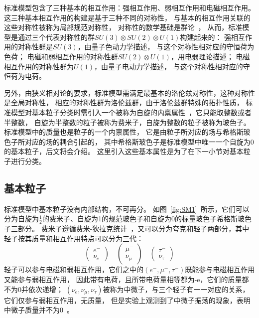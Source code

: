 标准模型包含了三种基本的相互作用：强相互作用、弱相互作用和电磁相互作用。
这三种基本相互作用的构建是基于三种不同的对称性，
与基本的相互作用关联的这些对称性被称为局部规范对称性，
对称性的数学基础是群论~\cite{GROUP}，
从而，标准模型是通过三个代表对称性的群$SU(3)	\otimes SU(2)	\otimes U(1)$构建起来的：
强相互作用的对称性群是$SU(3)$，由量子色动力学描述，
与这个对称性相对应的守恒荷为色荷；
电磁和弱相互作用的对称性群$SU(2)	\otimes U(1)$，用电弱理论描述；
电磁相互作用的对称性群为$U(1)$，由量子电动力学描述，
与这个对称性相对应的守恒荷为电荷。

另外，由狭义相对论的要求，标准模型需满足最基本的洛伦兹对称性，这种对称性是全局对称性，
相应的对称性群为洛伦兹群，由于洛伦兹群特殊的拓扑性质，
标准模型对基本粒子分类时需引入一个被称为自旋的内禀属性~\cite{QFT1}，它只能取整数或者半整数，
自旋为半整数的粒子被称为费米子，自旋为整数的粒子被称为玻色子。
标准模型中的质量也是粒子的一个内禀属性，
它是由粒子所对应的场与希格斯玻色子所对应的场的耦合引起的，
其中希格斯玻色子是标准模型中唯一一个自旋为0的基本粒子，后文将会介绍。
这里引入这些基本属性是为了在下一小节对基本粒子进行分类。

\subsection{基本粒子}
\label{sec:EP}

标准模型中基本粒子没有内部结构，不可再分。
如图~\ref{fig:SM1}~所示，它们可以分为自旋为$\frac{1}{2}$的费米子、自旋为1的规范玻色子和自旋为0的标量玻色子希格斯玻色子三部分。
费米子遵循费米-狄拉克统计~\cite{FERMIS1,FERMIS2}，又可以分为夸克和轻子两部分，其中轻子按其质量和相互作用特点可以分为三代：
\begin{equation} 
\label{eq:EP1}
\left( \begin{aligned}
e^-\\ \nu_e
\end{aligned}
\right)
\quad
\left( \begin{aligned}
\mu^-\\ \nu_{\mu}
\end{aligned}
\right)
\quad
\left( \begin{aligned}
\tau^-\\ \nu_{\tau}
\end{aligned}
\right)
\end{equation}
轻子可以参与电磁和弱相互作用，它们之中的$(e^-,\mu^-,\tau^-)$既能参与电磁相互作用又能参与弱相互作用，
因此带有电荷，且所带电荷量相等都为-e，它们的质量都不为0并依次递增；
$(\nu_e,\nu_{\mu},\nu_{\tau})$被称为中微子，与三个轻子有一一对应的关系，它们仅参与弱相互作用，无质量，
但是实验上观测到了中微子振荡的现象，表明中微子质量并不为0~\cite{NEUTRINO1,NEUTRINO2}。

